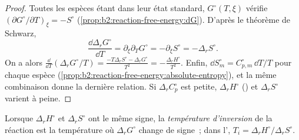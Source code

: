 \begin{proof}
Toutes les espèces étant dans leur état standard, $G^\circ(T, \xi)$ vérifie $(\partial
G^\circ/\partial T)_\xi = -S^\circ$ (\cref{prop:b2:reaction-free-energy:dG}).
D'après le théorème de Schwarz,
\[
  \frac{\dd\Delta_r G^\circ}{\dd T} = \partial_\xi\partial_T G^\circ =
  -\partial_\xi S^\circ = -\Delta_r S^\circ .
\] On a alors $\frac{\dd}{\dd
T}(\Delta_r G^\circ/T) = \frac{-T\Delta_r S^\circ - \Delta_r G^\circ}{T^2} =
-\frac{\Delta_r H^\circ}{T^2}$. Enfin, $\dd S^\circ_m = C^\circ_{p,m}\,\dd
T/T$ pour chaque espèce (\cref{prop:b2:reaction-free-energy:absolute-entropy}),
et la même combinaison donne la dernière relation. Si $\Delta_r C^\circ_p$ est
petite, $\Delta_r H^\circ$ () et $\Delta_r S^\circ$ varient à peine.
\end{proof}

\begin{definition}\label{def:b2:reaction-free-energy:inversion-temperature}
Lorsque $\Delta_r H^\circ$ et $\Delta_r S^\circ$ ont le même signe, la
\emph{température d'inversion} de la réaction est
la température où $\Delta_r G^\circ$ change de signe~; dans l', $T_i = \Delta_r H^\circ/\Delta_r S^\circ$.
\end{definition}

